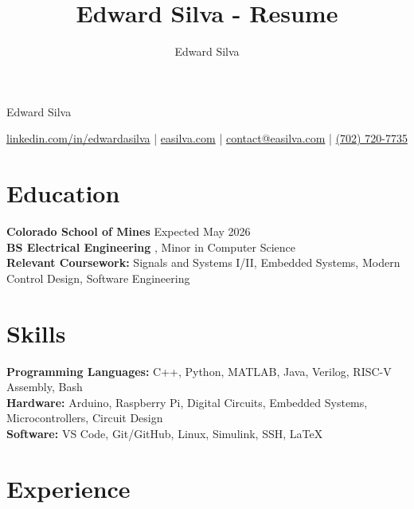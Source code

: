 \documentclass[11pt]{article}
\title{Edward Silva - Resume}
\author{Edward Silva}
\begin{document}
\thispagestyle{empty}

\centerline{\huge Edward Silva}
\vspace{3pt}

\centerline{\href{https://www.linkedin.com/in/edwardasilva}{linkedin.com/in/edwardasilva} | \href{https://easilva.com}{easilva.com} | \href{mailto:contact@easilva.com}{contact@easilva.com} | \href{tel:7027207735}{(702) 720-7735}}

\section*{Education}

\textbf{Colorado School of Mines} \hfill Expected May 2026 \\
\textbf{BS Electrical Engineering} , Minor in Computer Science \\



\textbf{Relevant Coursework:} Signals and Systems I/II, Embedded Systems, Modern Control Design, Software Engineering \\

\section*{Skills}

\textbf{Programming Languages:} C++, Python, MATLAB, Java, Verilog, RISC-V Assembly, Bash \\
\textbf{Hardware:} Arduino, Raspberry Pi, Digital Circuits, Embedded Systems, Microcontrollers, Circuit Design \\
\textbf{Software:} VS Code, Git/GitHub, Linux, Simulink, SSH, LaTeX \\

\section*{Experience}
\end{document}
